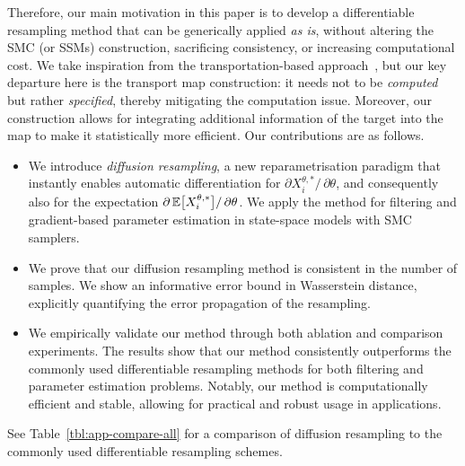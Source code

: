 \documentclass{article}
\begin{document}
Therefore, our main motivation in this paper is to develop a differentiable resampling method that can be generically applied \emph{as is}, without altering the SMC (or SSMs) construction, sacrificing consistency, or increasing computational cost. 
We take inspiration from the transportation-based approach~\citep{Corenflos2021}, but our key departure here is the transport map construction: it needs not to be \emph{computed} but rather \emph{specified}, thereby mitigating the computation issue. 
Moreover, our construction allows for integrating additional information of the target into the map to make it statistically more efficient. 
Our contributions are as follows.
\begin{itemize}
    \item We introduce \emph{diffusion resampling}, a new reparametrisation paradigm that instantly enables automatic differentiation for $\partial X_i^{\theta, *} / \, \partial \theta$, and consequently also for the expectation $\partial \operatorname{\mathbb{E}} \bigl[ X_i^{\theta, *} \bigr] / \, \partial \theta$.
    We apply the method for filtering and gradient-based parameter estimation in state-space models with SMC samplers.
    \item We prove that our diffusion resampling method is consistent in the number of samples. 
    We show an informative error bound in Wasserstein distance, explicitly quantifying the error propagation of the resampling. 
    \item We empirically validate our method through both ablation and comparison experiments. 
    The results show that our method consistently outperforms the commonly used differentiable resampling methods for both filtering and parameter estimation problems. 
    Notably, our method is computationally efficient and stable, allowing for practical and robust usage in applications. 
\end{itemize}

See Table~\ref{tbl:app-compare-all} for a comparison of diffusion resampling to the commonly used differentiable resampling schemes. 
\end{document}
